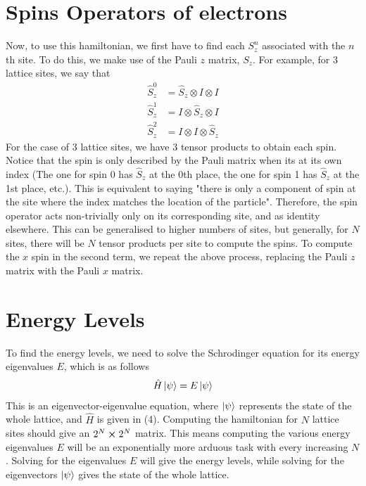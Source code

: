 \documentclass{article}
\begin{document}
\section{Spins Operators of electrons}
Now, to use this hamiltonian, we first have to find each $S_z^n$ associated with the $n$th site. 
To do this, we make use of the Pauli $z$ matrix, $S_z$. For example, for 3 lattice sites, we say that 
\begin{align*}
    \hat{S}_z^0&=\hat{S}_z\otimes I\otimes I\\
    \hat{S}_z^1&=I\otimes \hat{S}_z\otimes I\\
    \hat{S}_z^2&=I\otimes I\otimes \hat{S}_z
\end{align*}
For the case of 3 lattice sites, we have 3 tensor products to obtain each spin. Notice that the spin is only described by the Pauli matrix when its at its own index
(The one for spin 0 has $\hat{S}_z$ at the 0th place, the one for spin 1 has $\hat{S}_z$ at the 1st place, etc.). This is equivalent 
to saying "there is only a component of spin at the site where the index matches 
the location of the particle". Therefore, the spin operator acts non-trivially only on its corresponding site, and as identity elsewhere.
This can be generalised to higher numbers of sites, but generally, for $N$ sites, 
there will be $N$ tensor products per site to compute the spins. To compute the $x$ spin in 
the second term, we repeat the above process,
 replacing the Pauli $z$ matrix with the Pauli $x$ matrix. 
\section{Energy Levels}
To find the energy levels, we need to solve the Schrodinger equation for its energy eigenvalues $E$, which is as follows 
\begin{align}
    \hat{H}\ket{\psi}=E\ket{\psi}
\end{align}
This is an eigenvector-eigenvalue equation, where $\ket{\psi}$ represents the state of the whole lattice, and $\hat{H}$ is given in (4).
Computing the hamiltonian for $N$ lattice sites should give an $2^N\cross 2^N$ matrix. This means computing the various 
energy eigenvalues $E$ will be an exponentially more arduous task with every increasing $N$. Solving for the eigenvalues $E$ will give the 
energy levels, while solving for the eigenvectors $\ket{\psi}$ gives the state of the whole lattice.
\end{document}
